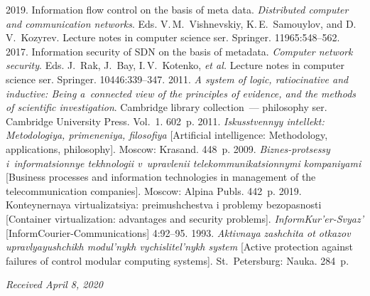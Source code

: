 \begin{multicols}{2}
{{\begin{thebibliography}{99}
 2019. Information flow control on the 
basis of meta data. \textit{Distributed computer and communication networks}.
 Eds. V.\,M.~Vishnevskiy, K.\,E.~Samouylov, and 
D.\,V.~Kozyrev. Lecture notes in computer science ser. Springer. 11965:548--562.
 2017. Information 
security of SDN on the basis of metadata. \textit{Computer network security}. Eds. J.~Rak, J.~Bay, 
I.\,V.~Kotenko, \textit{et al.} Lecture notes in computer science ser. Springer. 10446:339--347.
 2011. \textit{A system of logic, ratiocinative and inductive: Being a~connected view of 
the principles of evidence, and the methods of scientific investigation}. 
Cambridge library collection~--- philosophy ser. 
Cambridge University Press. Vol.~1.   602~p.
 2011. \textit{Iskusstvennyy intellekt: Metodologiya, primeneniya, filosofiya} 
[Artificial intelligence: Methodology, applications, philosophy]. Moscow: Krasand. 448~p.
 2009. 
\textit{Biznes-protsessy 
i~informatsionnye tekhnologii v~upravlenii telekommunikatsionnymi kompaniyami} [Business 
processes and information technologies in management of the telecommunication companies]. 
Moscow: Alpina Publs. 442~p.
 2019. Konteynernaya virtualizatsiya: preimushchestva i problemy bezopasnosti 
[Container virtualization: advantages and security problems]. \textit{InformKur'er-Svyaz'} 
[InformCourier-Communications] 4:92--95.
 1993. \textit{Aktivnaya 
zashchita ot otkazov upravlyayushchikh modul'nykh vychislitel'nykh system} [Active protection against 
failures of control modular computing systems]. St.\ Petersburg: Nauka. 284~p.

\end{thebibliography}

 }
 }

\end{multicols}

\vspace*{-9pt}

\hfill{\small\textit{Received April 8, 2020}}






